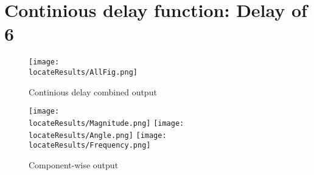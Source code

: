 \newpage
\section{Continious delay function: Delay of 6}
\begin{figure}[hb]
    \texttt{[image: \\locateResults/AllFig.png]}    
    \caption{Continious delay combined output}
    \label{fig:PMUsim-Cont6-allfig}
\end{figure}


     \begin{figure}
        \caption{Component-wise output}
 
    \texttt{[image: \\locateResults/Magnitude.png]}    
         \label{fig:PMUsim-Cont6Mag}
   \texttt{[image: \\locateResults/Angle.png]}    
         \label{fig:PMUsim-cont6Ang}
   \texttt{[image: \\locateResults/Frequency.png]}    
         \label{fig:PMUsim-Cont6Freq}
 
\end{figure}


